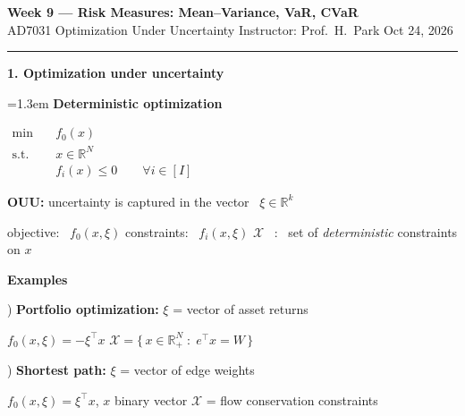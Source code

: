 \documentclass[10pt]{article}
\newcommand{\beat}[2]{%
  \par\bigskip\vspace{4pt}
  {\color{ruleink}\rule{\textwidth}{1pt}}\par\nobreak\vspace{4pt}
  {\large\bfseries #1.\; #2}\par\nobreak\vspace{6pt}}
\newenvironment{board}{%
  \par\vspace{4pt}
  \begingroup\leftskip=1.3em\relax\parskip=2pt\relax}{%
  \par\endgroup\vspace{4pt}}
\begin{document}
{\Large\bfseries Week 9 --- Risk Measures: Mean--Variance, VaR, CVaR}\\[2pt]
{\small AD7031 Optimization Under Uncertainty \quad\textbullet\quad Instructor: Prof.\ H.\ Park \quad\textbullet\quad Oct 24, 2026}

\beat{1}{Optimization under uncertainty}
\begin{board}
\textbf{Deterministic optimization}
\vspace{2pt}

\begin{center}
$\begin{aligned}
  \min\quad & f_0(x) \\
  \text{s.t.}\quad & x \in \mathbb{R}^N \\
                   & f_i(x) \le 0 \qquad \forall i \in [I]
\end{aligned}$
\end{center}
\vspace{10pt}

\textbf{OUU:} \quad uncertainty is captured in the vector \ $\xi \in \mathbb{R}^k$
\vspace{4pt}

\quad objective: \ $f_0(x, \xi)$ \qquad constraints: \ $f_i(x, \xi)$ \qquad
$\mathcal{X}$ \ : \ set of \emph{deterministic} constraints on $x$
\vspace{12pt}

\textbf{Examples}
\vspace{4pt}

) \textbf{Portfolio optimization:} \quad $\xi$ = vector of asset returns
\vspace{3pt}

\qquad\quad $f_0(x, \xi) = -\xi^{\top}x$  \qquad\qquad
$\mathcal{X} = \{\, x \in \mathbb{R}^N_+ \;:\; e^{\top}x = W \,\}$
\vspace{2pt}

\qquad{}
\vspace{8pt}

) \textbf{Shortest path:} \quad $\xi$ = vector of edge weights
\vspace{3pt}

\qquad\quad $f_0(x, \xi) = \xi^{\top}x$, \quad $x$ binary vector \qquad\qquad
$\mathcal{X}$ = flow conservation constraints
\vspace{14pt}


\end{board}
\end{document}
